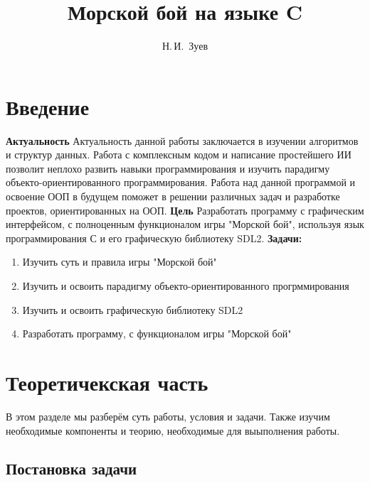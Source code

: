 \documentclass[14pt, oneside]{altsu-report}
\title{Морской бой на языке C}
\author{Н.\,И.~Зуев}
\institute{Институт цифровых технологий, электроники и физики}
\date{\the\year}
\begin{document}
\maketitle

\setcounter{page}{2}
\makeabstract
\tableofcontents

\chapter*{Введение}
\textbf{Актуальность}
\newline
Актуальность данной работы заключается в изучении алгоритмов и структур данных. Работа с комплексным кодом и написание простейшего ИИ позволит неплохо развить навыки программирования и изучить парадигму объекто-ориентированного программирования. Работа над данной программой и освоение ООП в будущем поможет в решении различных задач и разработке проектов, ориентированных на ООП.
\newline
\textbf{Цель}
\newline
Разработать программу с графическим интерфейсом, с полноценным функционалом игры "Морской бой", используя язык программирования С и его графическую библиотеку SDL2.
\newline
\textbf{Задачи:}
\begin{enumerate}
\item Изучить суть и правила игры "Морской бой"
\item Изучить и освоить парадигму объекто-ориентированного прогрммирования
\item Изучить и освоить графическую библиотеку SDL2 
\item Разработать программу, с функционалом игры "Морской бой"
\end{enumerate}





\chapter{Теоретичекская часть}
В этом разделе мы разберём суть работы, условия и задачи. Также изучим необходимые компоненты и теорию, необходимые для выыполнения работы.
\section{Постановка задачи}
\end{document}
